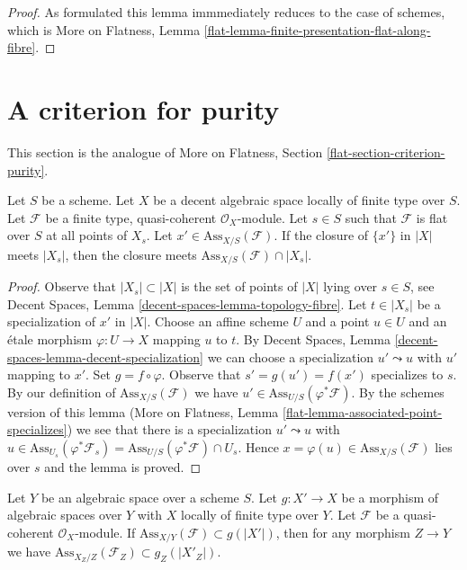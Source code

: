 \begin{proof}
As formulated this lemma immmediately reduces
to the case of schemes, which is
More on Flatness, Lemma
\ref{flat-lemma-finite-presentation-flat-along-fibre}.
\end{proof}




\section{A criterion for purity}
\label{section-criterion-purity}

\noindent
This section is the analogue of More on Flatness, Section
\ref{flat-section-criterion-purity}.

\begin{lemma}
\label{lemma-associated-point-specializes}
Let $S$ be a scheme. Let $X$ be a decent algebraic space
locally of finite type over $S$.
Let $\mathcal{F}$ be a finite type, quasi-coherent $\mathcal{O}_X$-module.
Let $s \in S$ such that $\mathcal{F}$ is flat over $S$ at all points of $X_s$.
Let $x' \in \text{Ass}_{X/S}(\mathcal{F})$. If
the closure of $\{x'\}$ in $|X|$ meets $|X_s|$, then the closure
meets $\text{Ass}_{X/S}(\mathcal{F}) \cap |X_s|$.
\end{lemma}

\begin{proof}
Observe that $|X_s| \subset |X|$ is the set of points of $|X|$
lying over $s \in S$, see
Decent Spaces, Lemma \ref{decent-spaces-lemma-topology-fibre}.
Let $t \in |X_s|$ be a specialization of $x'$ in $|X|$.
Choose an affine scheme $U$ and a point $u \in U$ and
an \'etale morphism $\varphi : U \to X$ mapping $u$ to $t$.
By Decent Spaces, Lemma \ref{decent-spaces-lemma-decent-specialization}
we can choose a specialization $u' \leadsto u$
with $u'$ mapping to $x'$. Set $g = f \circ \varphi$.
Observe that $s' = g(u') = f(x')$ specializes to $s$.
By our definition of $\text{Ass}_{X/S}(\mathcal{F})$
we have $u' \in \text{Ass}_{U/S}(\varphi^*\mathcal{F})$.
By the schemes version of this lemma
(More on Flatness, Lemma \ref{flat-lemma-associated-point-specializes})
we see that there is a specialization $u' \leadsto u$ with
$u \in \text{Ass}_{U_s}(\varphi^*\mathcal{F}_s) =
\text{Ass}_{U/S}(\varphi^*\mathcal{F}) \cap U_s$.
Hence $x = \varphi(u) \in \text{Ass}_{X/S}(\mathcal{F})$
lies over $s$ and the lemma is proved.
\end{proof}

\begin{lemma}
\label{lemma-contains-relative-ass-after-base-change}
Let $Y$ be an algebraic space over a scheme $S$. Let $g : X' \to X$ be a
morphism of algebraic spaces over $Y$ with $X$ locally of finite type over $Y$.
Let $\mathcal{F}$ be a quasi-coherent $\mathcal{O}_X$-module.
If $\text{Ass}_{X/Y}(\mathcal{F}) \subset g(|X'|)$, then for any morphism
$Z \to Y$ we have $\text{Ass}_{X_Z/Z}(\mathcal{F}_Z) \subset g_Z(|X'_Z|)$.
\end{lemma}

